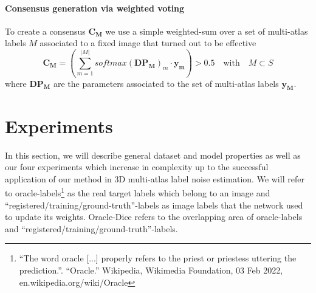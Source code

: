     \paragraph{\textbf{Consensus generation via weighted voting}}
        \label{sec:consensus}
        To create a consensus \(\mathbf{C_M}\) we use a simple weighted-sum over a set of multi-atlas labels \(M\) associated to a fixed image that turned out to be effective
        \begin{equation}
            \label{eq:weighted_sum}
            \mathbf{C_M} = \left(\sum_{m=1}^{\lvert M \rvert} softmax(\mathbf{DP_{M}})_{m} \cdot \mathbf{y_m}\right) > 0.5 \quad \textrm{with} \quad M \subset S
        \end{equation}
        where \(\mathbf{DP_{M}}\) are the parameters associated to the set of multi-atlas labels \(\mathbf{y_M}\).


\newpage
\section{Experiments}
    \label{sec:experiments_deepstaple}
    In this section, we will describe general dataset and model properties as well as our four experiments which increase in complexity up to the successful application of our method in 3D multi-atlas label noise estimation. We will refer to oracle-labels\footnote{``The word oracle [...] properly refers to the priest or priestess uttering the prediction.''. ``Oracle.'' Wikipedia, Wikimedia Foundation, 03 Feb 2022, en.wikipedia.org/wiki/Oracle} as the real target labels which belong to an image and “registered/training/ground-truth”-labels as image labels that the network used to update its weights. Oracle-Dice refers to the overlapping area of oracle-labels and “registered/training/ground-truth”-labels.

